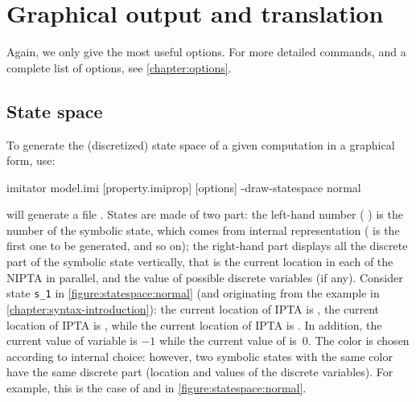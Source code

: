 \chapter{Graphical output and translation}


Again, we only give the most useful options.
For more detailed commands, and a complete list of options, see \cref{chapter:options}.

\section{State space}

To generate the (discretized) state space of a given computation in a graphical form, use:

\begin{terminal}
imitator model.imi [property.imiprop] [options] -draw-statespace normal
\end{terminal}

\imitator{} will generate a file .
States are made of two part: the left-hand number (\eg{} ) is the number of the symbolic state, which comes from \imitator{} internal representation ( is the first one to be generated, and so on); the right-hand part displays all the discrete part of the symbolic state vertically, that is the current location in each of the NIPTA in parallel, and the value of possible discrete variables (if any).
Consider state \texttt{s\_1} in \cref{figure:statespace:normal} (and originating from the example in \cref{chapter:syntax-introduction}):
the current location of IPTA  is ,
the current location of IPTA  is ,
while
the current location of IPTA  is .
In addition, the current value of variable  is $-1$ while the current value of  is~0.
The color is chosen according to \imitator{} internal choice: however, two symbolic states with the same color have the same discrete part (location and values of the discrete variables).
For example, this is the case of  and  in \cref{figure:statespace:normal}.

